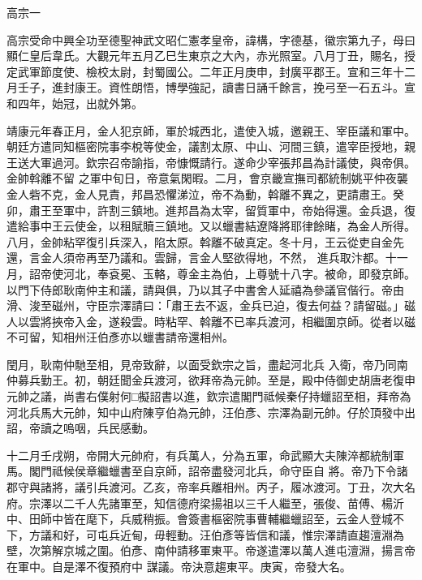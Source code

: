 
\begin{pinyinscope}

 高宗一



 高宗受命中興全功至德聖神武文昭仁憲孝皇帝，諱構，字德基，徽宗第九子，母曰顯仁皇后韋氏。大觀元年五月乙巳生東京之大內，赤光照室。八月丁丑，賜名，授
 定武軍節度使、檢校太尉，封蜀國公。二年正月庚申，封廣平郡王。宣和三年十二月壬子，進封康王。資性朗悟，博學強記，讀書日誦千餘言，挽弓至一石五斗。宣和四年，始冠，出就外第。



 靖康元年春正月，金人犯京師，軍於城西北，遣使入城，邀親王、宰臣議和軍中。朝廷方遣同知樞密院事李梲等使金，議割太原、中山、河間三鎮，遣宰臣授地，親王送大軍過河。欽宗召帝諭指，帝慷慨請行。遂命少宰張邦昌為計議使，與帝俱。金帥斡離不留
 之軍中旬日，帝意氣閑暇。二月，會京畿宣撫司都統制姚平仲夜襲金人砦不克，金人見責，邦昌恐懼涕泣，帝不為動，斡離不異之，更請肅王。癸卯，肅王至軍中，許割三鎮地。進邦昌為太宰，留質軍中，帝始得還。金兵退，復遣給事中王云使金，以租賦贖三鎮地。又以蠟書結遼降將耶律餘睹，為金人所得。八月，金帥粘罕復引兵深入，陷太原。斡離不破真定。冬十月，王云從吏自金先還，言金人須帝再至乃議和。雲歸，言金人堅欲得地，不然，
 進兵取汴都。十一月，詔帝使河北，奉袞冕、玉輅，尊金主為伯，上尊號十八字。被命，即發京師。以門下侍郎耿南仲主和議，請與俱，乃以其子中書舍人延禧為參議官偕行。帝由滑、浚至磁州，守臣宗澤請曰：「肅王去不返，金兵已迫，復去何益？請留磁。」磁人以雲將挾帝入金，遂殺雲。時粘罕、斡離不已率兵渡河，相繼圍京師。從者以磁不可留，知相州汪伯彥亦以蠟書請帝還相州。



 閏月，耿南仲馳至相，見帝致辭，以面受欽宗之旨，盡起河北兵
 入衛，帝乃同南仲募兵勤王。初，朝廷聞金兵渡河，欲拜帝為元帥。至是，殿中侍御史胡唐老復申元帥之議，尚書右僕射何□擬詔書以進，欽宗遣閣門祗候秦仔持蠟詔至相，拜帝為河北兵馬大元帥，知中山府陳亨伯為元帥，汪伯彥、宗澤為副元帥。仔於頂發中出詔，帝讀之嗚咽，兵民感動。



 十二月壬戌朔，帝開大元帥府，有兵萬人，分為五軍，命武顯大夫陳淬都統制軍馬。閣門祗候侯章繼蠟書至自京師，詔帝盡發河北兵，命守臣自
 將。帝乃下令諸郡守與諸將，議引兵渡河。乙亥，帝率兵離相州。丙子，履冰渡河。丁丑，次大名府。宗澤以二千人先諸軍至，知信德府梁揚祖以三千人繼至，張俊、苗傅、楊沂中、田師中皆在麾下，兵威稍振。會簽書樞密院事曹輔繼蠟詔至，云金人登城不下，方議和好，可屯兵近甸，毋輕動。汪伯彥等皆信和議，惟宗澤請直趨澶淵為壁，次第解京城之圍。伯彥、南仲請移軍東平。帝遂遣澤以萬人進屯澶淵，揚言帝在軍中。自是澤不復預府中
 謀議。帝決意趨東平。庚寅，帝發大名。




\end{pinyinscope}
